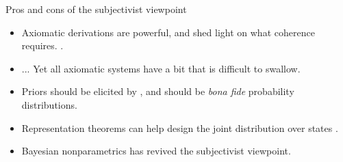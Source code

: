 \documentclass[10pt]{beamer}
\begin{document}
\begin{frame}{Pros and cons of the subjectivist viewpoint}
\begin{itemize}
  \item Axiomatic derivations are powerful, and shed light on what coherence requires. .
  \vfill
  \item[\frownie] ... Yet all axiomatic systems have a bit that is difficult to swallow.
  \vfill
  \item Priors should be elicited by , and should be \emph{bona fide} probability distributions.
  \vfill
  \item Representation theorems can help design the joint distribution over states \citep{OrRo14}.
  \vfill
  \item Bayesian nonparametrics has revived the subjectivist viewpoint.
\end{itemize}

\end{frame}


\end{document}

